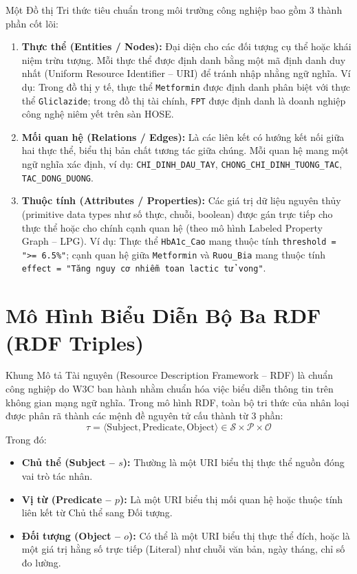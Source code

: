 \documentclass[12pt,a4paper]{report}
\begin{document}
Một Đồ thị Tri thức tiêu chuẩn trong môi trường công nghiệp bao gồm 3 thành phần cốt lõi:
\begin{enumerate}[itemsep=2pt, parsep=0pt, topsep=3pt]
    \item \textbf{Thực thể (Entities / Nodes):} Đại diện cho các đối tượng cụ thể hoặc khái niệm trừu tượng. Mỗi thực thể được định danh bằng một mã định danh duy nhất (Uniform Resource Identifier -- URI) để tránh nhập nhằng ngữ nghĩa. Ví dụ: Trong đồ thị y tế, thực thể \texttt{Metformin} được định danh phân biệt với thực thể \texttt{Gliclazide}; trong đồ thị tài chính, \texttt{FPT} được định danh là doanh nghiệp công nghệ niêm yết trên sàn HOSE.
    \item \textbf{Mối quan hệ (Relations / Edges):} Là các liên kết có hướng kết nối giữa hai thực thể, biểu thị bản chất tương tác giữa chúng. Mỗi quan hệ mang một ngữ nghĩa xác định, ví dụ: \texttt{CHI\_DINH\_DAU\_TAY}, \texttt{CHONG\_CHI\_DINH\_TUONG\_TAC}, \texttt{TAC\_DONG\_DUONG}.
    \item \textbf{Thuộc tính (Attributes / Properties):} Các giá trị dữ liệu nguyên thủy (primitive data types như số thực, chuỗi, boolean) được gán trực tiếp cho thực thể hoặc cho chính cạnh quan hệ (theo mô hình Labeled Property Graph -- LPG). Ví dụ: Thực thể \texttt{HbA1c\_Cao} mang thuộc tính \texttt{threshold = ">= 6.5\%"}; cạnh quan hệ giữa \texttt{Metformin} và \texttt{Ruou\_Bia} mang thuộc tính \texttt{effect = "Tăng nguy cơ nhiễm toan lactic tử vong"}.
\end{enumerate}

\section{Mô Hình Biểu Diễn Bộ Ba RDF (RDF Triples)}

Khung Mô tả Tài nguyên (Resource Description Framework -- RDF) là chuẩn công nghiệp do W3C ban hành nhằm chuẩn hóa việc biểu diễn thông tin trên không gian mạng ngữ nghĩa. Trong mô hình RDF, toàn bộ tri thức của nhân loại được phân rã thành các mệnh đề nguyên tử cấu thành từ 3 phần:
\begin{equation}
    \tau = \langle \text{Subject}, \text{Predicate}, \text{Object} \rangle \in \mathcal{S} \times \mathcal{P} \times \mathcal{O}
\end{equation}
Trong đó:
\begin{itemize}[itemsep=1pt, parsep=0pt, topsep=2pt]
    \item \textbf{Chủ thể (Subject -- $s$):} Thường là một URI biểu thị thực thể nguồn đóng vai trò tác nhân.
    \item \textbf{Vị từ (Predicate -- $p$):} Là một URI biểu thị mối quan hệ hoặc thuộc tính liên kết từ Chủ thể sang Đối tượng.
    \item \textbf{Đối tượng (Object -- $o$):} Có thể là một URI biểu thị thực thể đích, hoặc là một giá trị hằng số trực tiếp (Literal) như chuỗi văn bản, ngày tháng, chỉ số đo lường.
\end{itemize}
\end{document}
